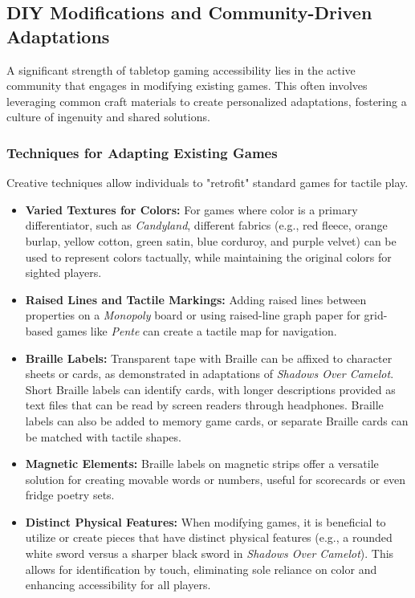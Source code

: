 \subsection{DIY Modifications and Community-Driven Adaptations}

A significant strength of tabletop gaming accessibility lies in the active community that engages in modifying existing games. This often involves leveraging common craft materials to create personalized adaptations, fostering a culture of ingenuity and shared solutions.

\subsubsection{Techniques for Adapting Existing Games}

Creative techniques allow individuals to "retrofit" standard games for tactile play.
\begin{itemize}
    \item \textbf{Varied Textures for Colors:} For games where color is a primary differentiator, such as \textit{Candyland}, different fabrics (e.g., red fleece, orange burlap, yellow cotton, green satin, blue corduroy, and purple velvet) can be used to represent colors tactually, while maintaining the original colors for sighted players\supercite{NFBBoardGames}.
    \item \textbf{Raised Lines and Tactile Markings:} Adding raised lines between properties on a \textit{Monopoly} board or using raised-line graph paper for grid-based games like \textit{Pente} can create a tactile map for navigation\supercite{NFBBoardGames}.
    \item \textbf{Braille Labels:} Transparent tape with Braille can be affixed to character sheets or cards, as demonstrated in adaptations of \textit{Shadows Over Camelot}\supercite{EqualEntryJohnstonQA}. Short Braille labels can identify cards, with longer descriptions provided as text files that can be read by screen readers through headphones\supercite{EqualEntryJohnstonQA}. Braille labels can also be added to memory game cards, or separate Braille cards can be matched with tactile shapes\supercite{PathsToLiteracyMemoryGame}.
    \item \textbf{Magnetic Elements:} Braille labels on magnetic strips offer a versatile solution for creating movable words or numbers, useful for scorecards or even fridge poetry sets\supercite{NFBBoardGames}.
    \item \textbf{Distinct Physical Features:} When modifying games, it is beneficial to utilize or create pieces that have distinct physical features (e.g., a rounded white sword versus a sharper black sword in \textit{Shadows Over Camelot})\supercite{EqualEntryJohnstonQA}. This allows for identification by touch, eliminating sole reliance on color and enhancing accessibility for all players.
\end{itemize}

